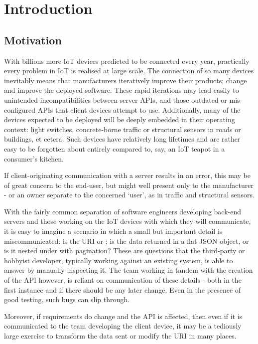 \section{Introduction}\label{intro}
\subsection{Motivation}\label{intro:motivation}

With billions more IoT devices predicted to be connected every year, \cite{gartner_billions_iot} practically every problem in IoT is realised at large scale. The connection of so many devices inevitably means that manufacturers iteratively improve their products; change and improve the deployed software. These rapid iterations may lead easily to unintended incompatibilities between server APIs, and those outdated or mis-configured APIs that client devices attempt to use. Additionally, many of the devices expected to be deployed will be deeply embedded in their operating context: light switches, concrete-borne traffic or structural sensors in roads or buildings, \cite{construction_and_iot, smart_concrete} et cetera. Such devices have relatively long lifetimes and are rather easy to be forgotten about entirely compared to, say, an IoT teapot in a consumer's kitchen.

If client-originating communication with a server results in an error, this may be of great concern to the end-user, but might well present only to the manufacturer - or an owner separate to the concerned `user', as in traffic and structural sensors.

With the fairly common separation of software engineers developing back-end servers and those working on the IoT devices with which they will communicate, it is easy to imagine a scenario in which a small but important detail is miscommunicated: is the URI  or ; is the data returned in a flat JSON object, or is it nested under  with pagination? These are questions that the third-party or hobbyist developer, typically working against an existing system, is able to answer by manually inspecting it. The team working in tandem with the creation of the API however, is reliant on communication of these details - both in the first instance and if there should be any later change. Even in the presence of good testing, such bugs can slip through.

Moreover, if requirements do change and the API is affected, then even if it is communicated to the team developing the client device, it may be a tediously large exercise to transform the data sent or modify the URI in many places.


